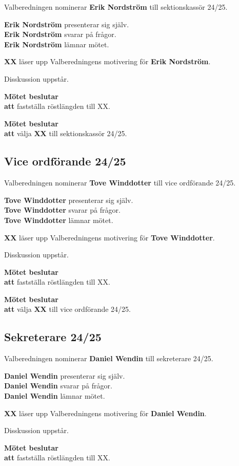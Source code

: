 \documentclass{datateknologsektionen-document}
\newcommand{\ind}{\hspace*{2em}}
\newcommand{\motetbeslutar}{\textbf{Mötet beslutar}}
\newcommand{\att}{\\\ind\textbf{att}}
\begin{document}
Valberedningen nominerar \textbf{Erik Nordström} till sektionskassör 24/25.

\textbf{Erik Nordström} presenterar sig själv.\\
\textbf{Erik Nordström} svarar på frågor.\\
\textbf{Erik Nordström} lämnar mötet.

\textbf{XX} läser upp Valberedningens motivering för \textbf{Erik Nordström}.

Disskussion uppstår.

\motetbeslutar
\att{} fastställa röstlängden till XX.

\motetbeslutar
\att{} välja \textbf{XX} till sektionskassör 24/25.

\subsection{Vice ordförande 24/25}

Valberedningen nominerar \textbf{Tove Winddotter} till vice ordförande 24/25.

\textbf{Tove Winddotter} presenterar sig själv.\\
\textbf{Tove Winddotter} svarar på frågor.\\
\textbf{Tove Winddotter} lämnar mötet.

\textbf{XX} läser upp Valberedningens motivering för \textbf{Tove Winddotter}.

Disskussion uppstår.

\motetbeslutar
\att{} fastställa röstlängden till XX.

\motetbeslutar
\att{} välja \textbf{XX} till vice ordförande 24/25.

\subsection{Sekreterare 24/25}

Valberedningen nominerar \textbf{Daniel Wendin} till sekreterare 24/25.

\textbf{Daniel Wendin} presenterar sig själv.\\
\textbf{Daniel Wendin} svarar på frågor.\\
\textbf{Daniel Wendin} lämnar mötet.

\textbf{XX} läser upp Valberedningens motivering för \textbf{Daniel Wendin}.

Disskussion uppstår.

\motetbeslutar
\att{} fastställa röstlängden till XX.
\end{document}
